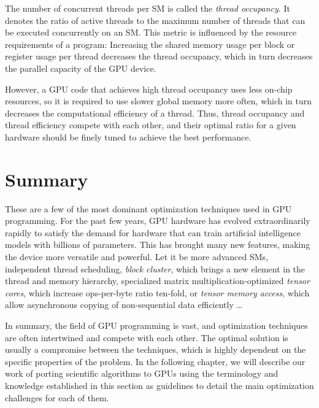 The number of concurrent threads per SM is called the \emph{thread occupancy}. It denotes the ratio of active threads to the maximum number of threads that can be executed concurrently on an SM. This metric is influenced by the resource requirements of a program: Increasing the shared memory usage per block or register usage per thread decreases the thread occupancy, which in turn decreases the parallel capacity of the GPU device.

However, a GPU code that achieves high thread occupancy uses less on-chip resources, so it is required to use slower global memory more often, which in turn decreases the computational efficiency of a thread. Thus, thread occupancy and thread efficiency compete with each other, and their optimal ratio for a given hardware should be finely tuned to achieve the best performance.

\section{Summary}

These are a few of the most dominant optimization techniques used in GPU programming. For the past few years, GPU hardware has evolved extraordinarily rapidly to satisfy the demand for hardware that can train artificial intelligence models with billions of parameters. This has brought many new features, making the device more versatile and powerful. Let it be more advanced SMs, independent thread scheduling, \emph{block cluster}, which brings a new element in the thread and memory hierarchy, specialized matrix multiplication-optimized \emph{tensor cores}, which increase ops-per-byte ratio ten-fold, or \emph{tensor memory access}, which allow asynchronous copying of non-sequential data efficiently \dots

In summary, the field of GPU programming is vast, and optimization techniques are often intertwined and compete with each other. The optimal solution is usually a compromise between the techniques, which is highly dependent on the specific properties of the problem. In the following chapter, we will describe our work of porting scientific algorithms to GPUs using the terminology and knowledge established in this section as guidelines to detail the main optimization challenges for each of them.